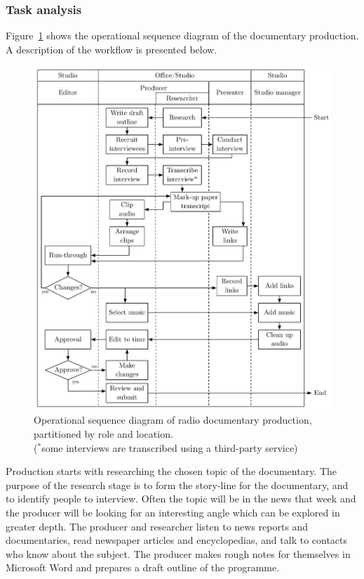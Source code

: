 \subsubsection{Task analysis}
Figure~\ref{fig:ethno-docs-workflow} shows the operational sequence diagram of the documentary production.  A
description of the workflow is presented below.

\begin{figure}
  \centering
  \includegraphics[width=\columnwidth]{figs/docs-workflow.pdf}
  \caption{Operational sequence diagram of radio documentary production, partitioned by role and location.\\
  {\footnotesize ($^{*}$some interviews are transcribed using a third-party service)}}
  \label{fig:ethno-docs-workflow}
\end{figure}

Production starts with researching the chosen topic of the documentary.  The purpose of the research stage is to form
the story-line for the documentary, and to identify people to interview.  Often the topic will be in the news that week
and the producer will be looking for an interesting angle which can be explored in greater depth.  The producer and
researcher listen to news reports and documentaries, read newspaper articles and encyclopedias, and talk to contacts
who know about the subject.  The producer makes rough notes for themselves in Microsoft Word and prepares a draft
outline of the programme.

